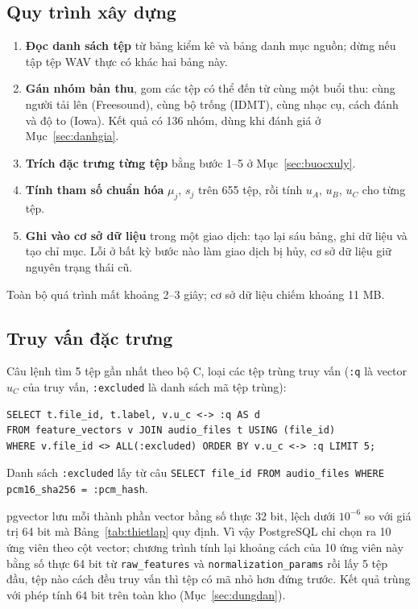 \documentclass[11pt,a4paper]{article}
\begin{document}
\subsection{Quy trình xây dựng}\label{sec:quytrinhxd}
\begin{enumerate}
\item \textbf{Đọc danh sách tệp} từ bảng kiểm kê và bảng danh mục nguồn; dừng nếu tập tệp WAV thực có khác hai bảng này.
\item \textbf{Gán nhóm bản thu}, gom các tệp có thể đến từ cùng một buổi thu: cùng người tải lên (Freesound), cùng bộ trống (IDMT), cùng nhạc cụ, cách đánh và độ to (Iowa). Kết quả có 136 nhóm, dùng khi đánh giá ở Mục~\ref{sec:danhgia}.
\item \textbf{Trích đặc trưng từng tệp} bằng bước 1--5 ở Mục~\ref{sec:buocxuly}.
\item \textbf{Tính tham số chuẩn hóa} $\mu_j$, $s_j$ trên 655 tệp, rồi tính $u_A$, $u_B$, $u_C$ cho từng tệp.
\item \textbf{Ghi vào cơ sở dữ liệu} trong một giao dịch: tạo lại sáu bảng, ghi dữ liệu và tạo chỉ mục. Lỗi ở bất kỳ bước nào làm giao dịch bị hủy, cơ sở dữ liệu giữ nguyên trạng thái cũ.
\end{enumerate}
Toàn bộ quá trình mất khoảng 2--3 giây; cơ sở dữ liệu chiếm khoảng 11 MB.

\subsection{Truy vấn đặc trưng}
Câu lệnh tìm 5 tệp gần nhất theo bộ C, loại các tệp trùng truy vấn (\texttt{:q} là vector $u_C$ của truy vấn, \texttt{:excluded} là danh sách mã tệp trùng):
\begin{verbatim}
SELECT t.file_id, t.label, v.u_c <-> :q AS d
FROM feature_vectors v JOIN audio_files t USING (file_id)
WHERE v.file_id <> ALL(:excluded) ORDER BY v.u_c <-> :q LIMIT 5;
\end{verbatim}
Danh sách \texttt{:excluded} lấy từ câu \texttt{SELECT file\_id FROM audio\_files WHERE pcm16\_sha256 = :pcm\_hash}.

pgvector lưu mỗi thành phần vector bằng số thực 32 bit, lệch dưới $10^{-6}$ so với giá trị 64 bit mà Bảng~\ref{tab:thietlap} quy định. Vì vậy PostgreSQL chỉ chọn ra 10 ứng viên theo cột vector; chương trình tính lại khoảng cách của 10 ứng viên này bằng số thực 64 bit từ \texttt{raw\_features} và \texttt{normalization\_params} rồi lấy 5 tệp đầu, tệp nào cách đều truy vấn thì tệp có mã nhỏ hơn đứng trước. Kết quả trùng với phép tính 64 bit trên toàn kho (Mục~\ref{sec:dungdan}).
\clearpage
\end{document}
